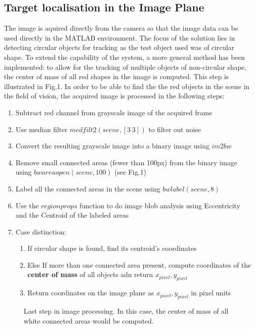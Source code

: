 \documentclass[letterpaper, 10 pt, conference]{IEEEconf}  %
\begin{document}
\subsection{Target localisation in the Image Plane}
The image is aquired directly from the camera so that the image data can be used directly in the MATLAB environment. The focus of the solution lies in detecting circular objects for tracking as the test object used was of circular shape. To extend the capability of the system, a more general method has been implemented: to allow for the tracking of multiple objects of non-circular shape, the center of mass of all red shapes in the image is computed. This step is illustrated in Fig.1. In order to be able to find the the red objects in the scene in the field of vision, the acquired image is processed in the following steps:
\begin{enumerate}
\item Subtract red channel from grayscale image of the acquired frame
\item Use median filter $medfilt2(scene,[3~3])$ to filter out noise
\item Convert the resulting grayscale image into a binary image using $im2bw$
\item Remove small connected areas (fewer than 100px) from the binary image using $bwareaopen(scene,100)$ (see Fig.1)
\item Label all the connected areas in the scene using $bwlabel(scene,8)$
\item Use the $regionprops$ function to do image blob analysis using Eccentricity and the Centroid of the labeled areas
\item Case distinction: 
{\setlength\itemindent{25pt} \begin{enumerate}\item{If circular shape is found, find its centroid's coordinates}\item{Else If more than one connected area present, compute coordinates of the \textbf{center of mass} of all objects adn return $x_{pixel},y_{pixel}$} \item{Return coordinates on the image plane as $x_{pixel},y_{pixel}$ in pixel units}\end{enumerate}} 
\end{enumerate}
\begin{figure}
\caption*{\label{fig:center of mass}Last step in image processing. In this case, the center of mass of all white connected areas would be computed.}
\end{figure}
\end{document}
